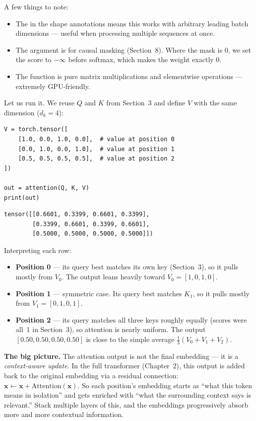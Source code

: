 A few things to note:
\begin{itemize}
  \item The \code{*} in the shape annotations means this works with arbitrary leading batch dimensions --- useful when processing multiple sequences at once.
  \item The  argument is for causal masking (Section~8). Where the mask is 0, we set the score to $-\infty$ before softmax, which makes the weight exactly 0.
  \item The function is pure matrix multiplications and elementwise operations --- extremely GPU-friendly.
\end{itemize}

Let us run it. We reuse $Q$ and $K$ from Section~3 and define $V$ with the same dimension ($d_k = 4$):

\demotag
\begin{lstlisting}
V = torch.tensor([
    [1.0, 0.0, 1.0, 0.0],  # value at position 0
    [0.0, 1.0, 0.0, 1.0],  # value at position 1
    [0.5, 0.5, 0.5, 0.5],  # value at position 2
])

out = attention(Q, K, V)
print(out)
\end{lstlisting}

\outputtag
\begin{lstlisting}
tensor([[0.6601, 0.3399, 0.6601, 0.3399],
        [0.3399, 0.6601, 0.3399, 0.6601],
        [0.5000, 0.5000, 0.5000, 0.5000]])
\end{lstlisting}

Interpreting each row:

\begin{itemize}
  \item \textbf{Position 0} --- its query best matches its own key (Section~3), so it pulls mostly from $V_0$. The output leans heavily toward $V_0 = [1, 0, 1, 0]$.
  \item \textbf{Position 1} --- symmetric case. Its query best matches $K_1$, so it pulls mostly from $V_1 = [0, 1, 0, 1]$.
  \item \textbf{Position 2} --- its query matches all three keys roughly equally (scores were all~1 in Section~3), so attention is nearly uniform. The output $[0.50, 0.50, 0.50, 0.50]$ is close to the simple average $\frac{1}{3}(V_0 + V_1 + V_2)$.
\end{itemize}

\textbf{The big picture.} The attention output is not the final embedding --- it is a \emph{context-aware update}. In the full transformer (Chapter~2), this output is added back to the original embedding via a residual connection: $\mathbf{x} \leftarrow \mathbf{x} + \mathrm{Attention}(\mathbf{x})$. So each position's embedding starts as ``what this token means in isolation'' and gets enriched with ``what the surrounding context says is relevant.'' Stack multiple layers of this, and the embeddings progressively absorb more and more contextual information.

